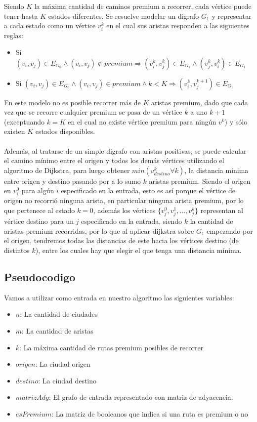 Siendo $K$ la máxima cantidad de caminos premium a recorrer, cada vértice puede tener hasta $K$ estados diferentes. Se resuelve modelar un digrafo $G_1$ y representar a cada estado como un vértice $v_i^k$ en el cual sus aristas responden a las siguientes reglas:
\begin{itemize}
	\item Si $(v_i,v_j) \in E_{G_0} \land (v_i,v_j) \notin premium \Rightarrow (v_i^k,v_j^k) \in E_{G_1} \land (v_j^k,v_i^k) \in E_{G_1}$
	\item Si $(v_i,v_j) \in E_{G_0} \land (v_i,v_j) \in premium \land k < K \Rightarrow (v_i^k,v_j^{k+1}) \in E_{G_1}$
\end{itemize}
En este modelo no es posible recorrer más de $K$ aristas premium, dado que cada vez que se recorre cualquier premium se pasa de un vértice $k$ a uno $k+1$ (exceptuando $k=K$ en el cual no existe vértice premium para ningún $v^k$) y sólo existen $K$ estados disponibles.\\\\
Además, al tratarse de un simple digrafo con aristas positivas, se puede calcular el camino mínimo entre el origen y todos los demás vértices utilizando el algoritmo de Dijkstra, para luego obtener $min(v_{destino}^k \forall k)$, la distancia mínima entre origen y destino pasando por a lo sumo $k$ aristas premium. Siendo el origen en $v_i^0$ para algún $i$ especificado en la entrada, esto es así porque el vértice de origen no recorrió ninguna arista, en particular ninguna arista premium, por lo que pertenece al estado $k=0$, además los vértices $\{v_j^0,v_j^1,...,v_j^k\}$ representan al vértice destino para un $j$ especificado en la entrada, siendo $k$ la cantidad de aristas premium recorridas, por lo que al aplicar dijkstra sobre $G_1$ empezando por el origen, tendremos todas las distancias de este hacia los vértices destino (de distintos $k$), entre los cuales hay que elegir el que tenga una distancia mínima. \\

\subsection{Pseudocodigo}

Vamos a utilizar como entrada en nuestro algoritmo las siguientes variables:
\begin{itemize}
	\item $n$: La cantidad de ciudades
	\item $m$: La cantidad de aristas
	\item $k$: La máxima cantidad de rutas premium posibles de recorrer
	\item $origen$: La ciudad origen
	\item $destino$: La ciudad destino
	\item $matrizAdy$: El grafo de entrada representado con matriz de adyacencia.
	\item $esPremium$: La matriz de booleanos que indica si una ruta es premium o no
\end{itemize}

